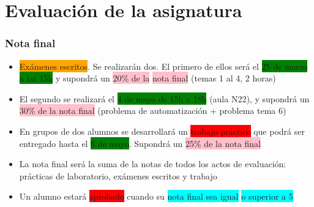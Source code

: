 \section[Evaluación]{Evaluación de la asignatura}

\begin{frame}[fragile, label=evaluacion]
\frametitle{Nota final}

\vspace*{-0.5cm}

\begin{itemize}
    \item \colorbox{orange}{Exámenes escritos}. Se realizarán dos. El primero de ellos será el \colorbox{green}{25 de marzo a las 15h} y supondrá un \colorbox{pink}{20\% de la} \colorbox{pink}{nota final} (temas 1 al 4, 2 horas)
    
    \item El segundo se realizará el \colorbox{green}{4 de mayo de 15h a 18h} (aula N22), y supondrá un \colorbox{pink}{30\% de la nota final} (problema de automatización + problema tema 6) 
    
    \item En grupos de dos alumnos se desarrollará un \colorbox{red}{trabajo práctico} que podrá ser entregado hasta el \colorbox{green}{6 de mayo}. Supondrá un \colorbox{pink}{25\% de la nota final}

   \item La nota final será la suma de la notas de todos los actos de evaluación: prácticas de laboratorio, exámenes escritos y trabajo


\item Un alumno estará \colorbox{red}{aprobado} cuando su \colorbox{cyan}{nota final sea igual} \colorbox{cyan}{o superior a 5}
\end{itemize}

\end{frame}